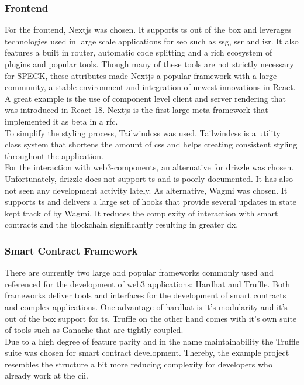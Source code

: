 \documentclass[oneside,a4paper,12pt, colorinlistoftodos]{article} %
\begin{document}
\subsubsection{Frontend}
For the frontend, Nextjs \cite{nextjs} was chosen. It supports \gls{ts} out of the box and leverages technologies used in large scale applications for \gls{seo} such as \gls{ssg}, \gls{ssr} and \gls{isr}. It also features a built in router, automatic code splitting and a rich ecosystem of plugins and popular tools. Though many of these tools are not strictly necessary for SPECK, these attributes made Nextjs a popular framework with a large community, a stable environment and integration of newest innovations in React. A great example is the use of component level client and server rendering that was introduced in React 18. Nextjs is the first large meta framework that implemented it as beta in a \gls{rfc}.\\
To simplify the styling process, Tailwindcss \cite{tailwind} was used. Tailwindcss is a utility class system that shortens the amount of css and helps creating consistent styling throughout the application. \\
For the interaction with web3-components, an alternative for drizzle was chosen. Unfortunately, drizzle does not support \gls{ts} and is poorly documented. It has also not seen any development activity lately. As alternative, Wagmi \cite{wagmi} was chosen. It supports \gls{ts} and delivers a large set of hooks that provide several updates in state kept track of by Wagmi. It reduces the complexity of interaction with smart contracts and the blockchain significantly resulting in greater \gls{dx}.

\subsubsection{Smart Contract Framework}
There are currently two large and popular frameworks commonly used and referenced for the development of web3 applications: Hardhat  and Truffle. Both frameworks deliver tools and interfaces for the development of smart contracts and complex applications. One advantage of hardhat is it's modularity and it's out of the box support for \gls{ts}. Truffle on the other hand comes with it's own suite of tools such as Ganache \cite{ganache} that are tightly coupled. \\
Due to a high degree of feature parity and in the name maintainability the Truffle suite was chosen for smart contract development. Thereby, the example project \cite{drizzleWithEvents} resembles the structure a bit more reducing complexity for developers who already work at the \gls{cii}. 
\end{document}
